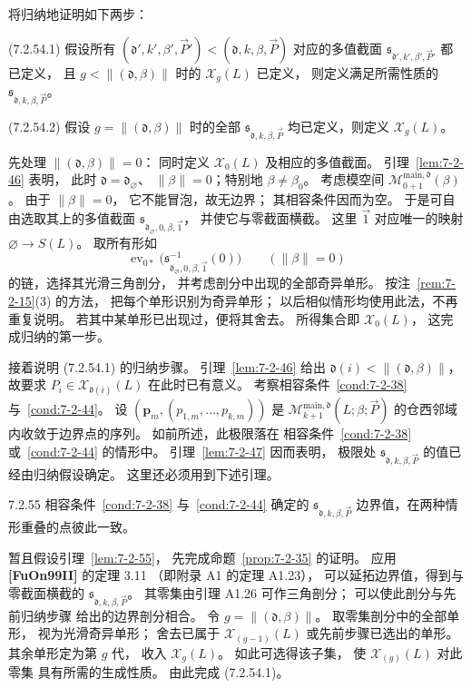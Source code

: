将归纳地证明如下两步：

\noindent\textup{(7.2.54.1)}\quad
假设所有
$(\mathfrak d',k',\beta',\vec P')
<(\mathfrak d,k,\beta,\vec P)$
对应的多值截面
$\mathfrak s_{\mathfrak d',k',\beta',\vec P'}$
都已定义，
且 $g<\|(\mathfrak d,\beta)\|$
时的 $\mathcal X_g(L)$ 已定义，
则定义满足所需性质的
$\mathfrak s_{\mathfrak d,k,\beta,\vec P}$。

\noindent\textup{(7.2.54.2)}\quad
假设 $g=\|(\mathfrak d,\beta)\|$
时的全部
$\mathfrak s_{\mathfrak d,k,\beta,\vec P}$
均已定义，则定义 $\mathcal X_g(L)$。

先处理 $\|(\mathfrak d,\beta)\|=0$：
同时定义 $\mathcal X_0(L)$
及相应的多值截面。
引理~\ref{lem:7-2-46} 表明，
此时 $\mathfrak d=\mathfrak d_\varnothing$、
$\|\beta\|=0$；特别地 $\beta\ne\beta_0$。
考虑模空间
$\mathcal M^{\mathrm{main},\mathfrak d}_{0+1}(\beta)$。
由于 $\|\beta\|=0$，
它不能冒泡，故无边界；
其相容条件因而为空。
于是可自由选取其上的多值截面
$\mathfrak s_{\mathfrak d_\varnothing,0,\beta,\vec 1}$，
并使它与零截面横截。
这里 $\vec 1$ 对应唯一的映射
$\varnothing\to S(L)$。
取所有形如
\[
\operatorname{ev}_{0*}
\bigl(\mathfrak s^{-1}_{\mathfrak d_\varnothing,
0,\beta,\vec 1}(0)\bigr)
\qquad(\|\beta\|=0)
\]
的链，选择其光滑三角剖分，
并考虑剖分中出现的全部奇异单形。
按注~\ref{rem:7-2-15}(3) 的方法，
把每个单形识别为奇异单形；
以后相似情形均使用此法，不再重复说明。
若其中某单形已出现过，便将其舍去。
所得集合即 $\mathcal X_0(L)$，
这完成归纳的第一步。

接着说明 (7.2.54.1) 的归纳步骤。
引理~\ref{lem:7-2-46} 给出
$\mathfrak d(i)<\|(\mathfrak d,\beta)\|$，
故要求 $P_i\in\mathcal X_{\mathfrak d(i)}(L)$
在此时已有意义。
考察相容条件~\ref{cond:7-2-38}
与~\ref{cond:7-2-44}。
设
$(\mathbf p_m,(p_{1,m},\ldots,p_{k,m}))$
是
$\mathcal M^{\mathrm{main},\mathfrak d}_{k+1}
(L;\beta;\vec P)$
的仓西邻域内收敛于边界点的序列。
如前所述，此极限落在
相容条件~\ref{cond:7-2-38}
或~\ref{cond:7-2-44} 的情形中。
引理~\ref{lem:7-2-47} 因而表明，
极限处
$\mathfrak s_{\mathfrak d,k,\beta,\vec P}$
的值已经由归纳假设确定。
这里还必须用到下述引理。

\begin{lemma}{7.2.55}\label{lem:7-2-55}
相容条件~\ref{cond:7-2-38}
与~\ref{cond:7-2-44} 确定的
$\mathfrak s_{\mathfrak d,k,\beta,\vec P}$
边界值，在两种情形重叠的点彼此一致。
\end{lemma}

暂且假设引理~\ref{lem:7-2-55}，
先完成命题~\ref{prop:7-2-35} 的证明。
应用 \textbf{[FuOn99II]} 的定理 3.11
（即附录 A1 的定理 A1.23），
可以延拓边界值，得到与零截面横截的
$\mathfrak s_{\mathfrak d,k,\beta,\vec P}$。
其零集由引理 A1.26 可作三角剖分；
可以使此剖分与先前归纳步骤
给出的边界剖分相合。
令 $g=\|(\mathfrak d,\beta)\|$。
取零集剖分中的全部单形，
视为光滑奇异单形；
舍去已属于 $\mathcal X_{(g-1)}(L)$
或先前步骤已选出的单形。
其余单形定为第 $g$ 代，
收入 $\mathcal X_g(L)$。
如此可选得该子集，
使 $\mathcal X_{(g)}(L)$ 对此零集
具有所需的生成性质。
由此完成 (7.2.54.1)。

